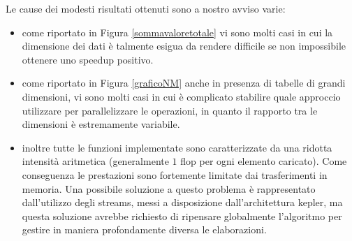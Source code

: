\documentclass[a4paper]{article}   %
\begin{document}
Le cause dei modesti risultati ottenuti sono a nostro avviso varie:
\begin{itemize}
\item come riportato in Figura \ref{sommavaloretotale} vi sono molti casi in cui la dimensione dei dati è talmente esigua da rendere difficile se non impossibile ottenere uno speedup positivo. 
\item come riportato in Figura \ref{graficoNM} anche in presenza di tabelle di grandi dimensioni, vi sono molti casi in cui è complicato stabilire quale approccio utilizzare per parallelizzare le operazioni, in quanto il rapporto tra le dimensioni è estremamente variabile. %
\item inoltre tutte le funzioni implementate sono caratterizzate da una ridotta intensità aritmetica (generalmente $1$ flop per ogni elemento caricato). Come conseguenza le prestazioni sono fortemente limitate dai trasferimenti in memoria. Una possibile soluzione a questo problema è rappresentato dall'utilizzo degli streams, messi a disposizione dall'architettura kepler, ma questa soluzione avrebbe richiesto di ripensare globalmente l'algoritmo per gestire in maniera profondamente diversa le elaborazioni.
\end{itemize}


\end{document}
